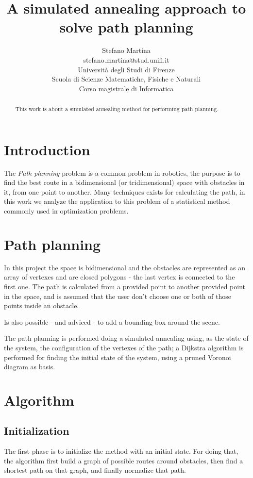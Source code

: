 \documentclass[a4paper]{article}
\author{
  {\Large Stefano Martina}\\
  {\small stefano.martina@stud.unifi.it}\\
  Universit\`a degli Studi di Firenze\\
  Scuola di Scienze Matematiche, Fisiche e Naturali\\
  Corso magistrale di Informatica
}
\title{{\Huge\bfseries A simulated annealing approach to solve path
    planning}}%
\begin{document}
\maketitle
\thispagestyle{empty}
\vfill
\begin{abstract}
  This work is about a simulated annealing method for performing path
  planning.
\end{abstract}

\section{Introduction}
The \emph{Path planning} problem is a common problem in robotics, the
purpose is to find the best route in a bidimensional (or
tridimensional) space with obstacles in it, from one point to
another. Many techniques exists for calculating the path, in this work
we analyze the application to this problem of a statistical method
commonly used in optimization problems.

\section{Path planning}
In this project the space is bidimensional and the obstacles are
represented as an array of vertexes and are closed polygons - the last
vertex is connected to the first one. The path is calculated from a
provided point to another provided point in the space, and is assumed
that the user don't choose one or both of those points inside an
obstacle.

Is also possible - and adviced - to add a bounding box around the
scene.

The path planning is performed doing a simulated annealing using, as the state of the system, the
configuration of the vertexes of the path; a Dijkstra algorithm is
performed for finding the initial state of the system, using a pruned 
Voronoi diagram as basis.

\section{Algorithm}
\subsection{Initialization}
The first phase is to initialize the method with an initial state. For
doing that, the algorithm first build a graph of possible routes
around obstacles, then find a shortest path on that graph, and finally
normalize that path.
\end{document}
